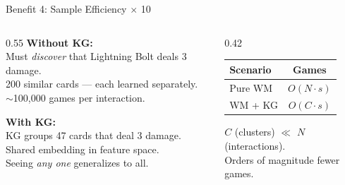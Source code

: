 \documentclass[aspectratio=169, 11pt]{beamer}
\begin{document}
\begin{frame}{Benefit 4: Sample Efficiency $\times$ 10}
  \begin{columns}[T]
    \begin{column}{0.55\textwidth}
      \textbf{Without KG:}\\
      Must \textit{discover} that Lightning Bolt deals 3 damage.\\
      200 similar cards --- each learned separately.\\
      $\sim$100{,}000 games per interaction.
      \vspace{0.3cm}

      \textbf{With KG:}\\
      KG groups 47 cards that deal 3 damage.\\
      Shared embedding in feature space.\\
      Seeing \textit{any one} generalizes to all.
    \end{column}
    \begin{column}{0.42\textwidth}
      \begin{table}
        \centering\scriptsize
        \begin{tabular}{@{}lc@{}}
          \toprule
          \textbf{Scenario} & \textbf{Games} \\
          \midrule
          Pure WM & $O(N \cdot s)$ \\
          WM + KG & $O(C \cdot s)$ \\
          \bottomrule
        \end{tabular}
      \end{table}
      \vspace{0.2cm}
      \footnotesize
      $C$ (clusters) $\ll$ $N$ (interactions).\\
      Orders of magnitude fewer games.
    \end{column}
  \end{columns}
\end{frame}
\end{document}
